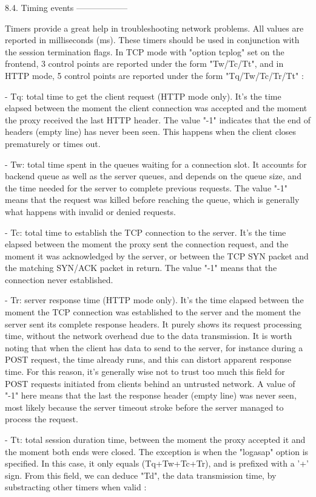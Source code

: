 8.4. Timing events
------------------

Timers provide a great help in troubleshooting network problems. All values are
reported in milliseconds (ms). These timers should be used in conjunction with
the session termination flags. In TCP mode with "option tcplog" set on the
frontend, 3 control points are reported under the form "Tw/Tc/Tt", and in HTTP
mode, 5 control points are reported under the form "Tq/Tw/Tc/Tr/Tt" :

  - Tq: total time to get the client request (HTTP mode only). It's the time
    elapsed between the moment the client connection was accepted and the
    moment the proxy received the last HTTP header. The value "-1" indicates
    that the end of headers (empty line) has never been seen. This happens when
    the client closes prematurely or times out.

  - Tw: total time spent in the queues waiting for a connection slot. It
    accounts for backend queue as well as the server queues, and depends on the
    queue size, and the time needed for the server to complete previous
    requests. The value "-1" means that the request was killed before reaching
    the queue, which is generally what happens with invalid or denied requests.

  - Tc: total time to establish the TCP connection to the server. It's the time
    elapsed between the moment the proxy sent the connection request, and the
    moment it was acknowledged by the server, or between the TCP SYN packet and
    the matching SYN/ACK packet in return. The value "-1" means that the
    connection never established.

  - Tr: server response time (HTTP mode only). It's the time elapsed between
    the moment the TCP connection was established to the server and the moment
    the server sent its complete response headers. It purely shows its request
    processing time, without the network overhead due to the data transmission.
    It is worth noting that when the client has data to send to the server, for
    instance during a POST request, the time already runs, and this can distort
    apparent response time. For this reason, it's generally wise not to trust
    too much this field for POST requests initiated from clients behind an
    untrusted network. A value of "-1" here means that the last the response
    header (empty line) was never seen, most likely because the server timeout
    stroke before the server managed to process the request.

  - Tt: total session duration time, between the moment the proxy accepted it
    and the moment both ends were closed. The exception is when the "logasap"
    option is specified. In this case, it only equals (Tq+Tw+Tc+Tr), and is
    prefixed with a '+' sign. From this field, we can deduce "Td", the data
    transmission time, by substracting other timers when valid :

